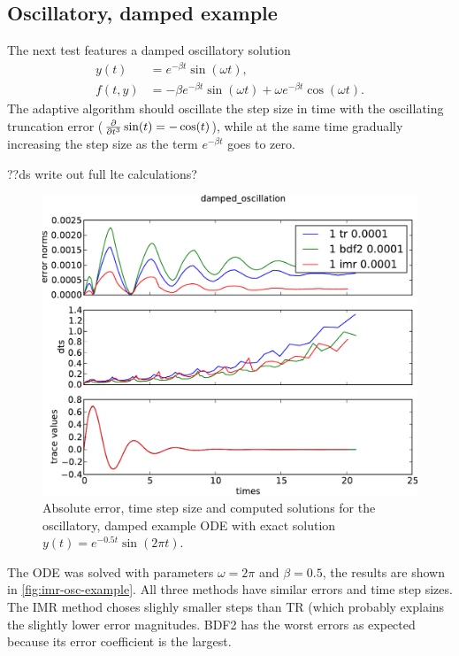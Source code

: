 \subsection{Oscillatory, damped example}
\label{sec:oscill-damp-example}

The next test features a damped oscillatory solution
\begin{equation}
  \label{eqn:imr-test-osc-damp}
  \begin{aligned}
    y(t) &= e^{-\beta t} \sin(\omega t), \\
    f(t,y) &= - \beta e^{-\beta t} \sin(\omega t) + \omega e^{-\beta t} \cos(\omega t).  \end{aligned}
\end{equation} 
The adaptive algorithm should oscillate the step size in time with the oscillating truncation error ($\frac{\partial }{\partial t^3} \sin(t) = -\cos(t)$), while at the same time gradually increasing the step size as the term $e^{-\beta t}$ goes to zero.

??ds write out full lte calculations?

\begin{figure}[h!]
  \centering \includegraphics[width=1\textwidth]{aimr/damped_oscillation-errornormsvs-dtsvs-tracevaluesvstimes}
  \caption{Absolute error, time step size and computed solutions for the oscillatory, damped example ODE with exact solution $y(t) = e^{-0.5t} \sin(2\pi t)$.}
  \label{fig:imr-osc-example}
\end{figure}

The ODE was solved with parameters $\omega = 2 \pi$ and $\beta = 0.5$, the results are shown in \autoref{fig:imr-osc-example}.
All three methods have similar errors and time step sizes.
The IMR method choses slighly smaller steps than TR (which probably explains the slightly lower error magnitudes.
BDF2 has the worst errors as expected because its error coefficient is the largest.


